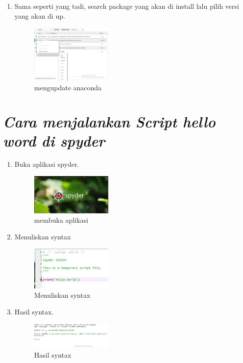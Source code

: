 \begin{enumerate}
\begin{enumerate}
\item Sama seperti yang tadi, search package yang akan di install lalu pilih versi yang akan di up.
\begin{figure}[hb]
\includegraphics[width=4cm]{figure/update5.png}
\centering
\caption{mengupdate anaconda}
\end{figure}

\end{enumerate}

\section*{\textit{ Cara menjalankan Script hello word di spyder }}

\begin{enumerate}

\item Buka aplikasi spyder.
\begin{figure}[hb]
\includegraphics[width=4cm]{figure/pemakaian1.png}
\centering
\caption{membuka aplikasi}
\end{figure}

\item Menuliskan syntax 
\begin{figure}[hb]
\includegraphics[width=4cm]{figure/pemakaian2.png}
\centering
\caption{Menuliskan syntax}
\end{figure}

\item Hasil syntax.
\begin{figure}[hb]
\includegraphics[width=4cm]{figure/pemakaian3.png}
\centering
\caption{Hasil syntax}
\end{figure}


\end{enumerate}
\end{enumerate}
